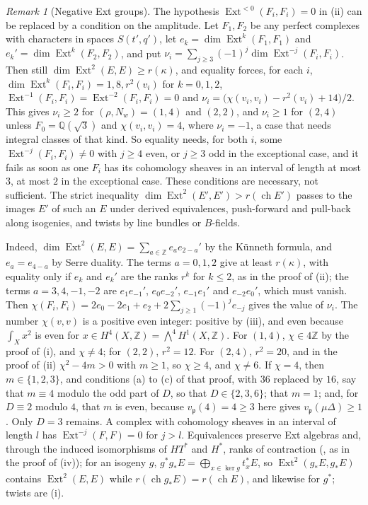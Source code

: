 \documentclass[11pt,reqno]{amsart}
\theoremstyle{plain}
\theoremstyle{definition}
\theoremstyle{remark}
\newtheorem{remark}[theorem]{Remark}
\newcommand{\QQ}{\mathbb{Q}}
\newcommand{\ZZ}{\mathbb{Z}}
\DeclareMathOperator{\ch}{ch}
\DeclareMathOperator{\Ext}{Ext}
\begin{document}
\begin{remark}[Negative Ext groups]\label{rem:quarticnegext}
The hypothesis $\Ext^{<0}(F_{i},F_{i})=0$ in
(ii) can be replaced by a condition on the
amplitude. Let $F_{1},F_{2}$ be any perfect complexes with characters in
spaces $S(t',q')$, let $e_{k}=\dim\Ext^{k}(F_{1},F_{1})$ and
$e_{k}'=\dim\Ext^{k}(F_{2},F_{2})$, and put
$\nu_{i}=\sum_{j\ge3}(-1)^{j}\dim\Ext^{-j}(F_{i},F_{i})$. Then still
$\dim\Ext^{2}(E,E)\ge r(\kappa)$, and equality forces, for each $i$,
$\dim\Ext^{k}(F_{i},F_{i})=1,8,r^{2}(v_{i})$ for $k=0,1,2$,
$\Ext^{-1}(F_{i},F_{i})=\Ext^{-2}(F_{i},F_{i})=0$ and
$\nu_{i}=\bigl(\chi(v_{i},v_{i})-r^{2}(v_{i})+14\bigr)/2$. This gives
$\nu_{i}\ge2$ for $(\rho,N_{w})=(1,4)$ and $(2,2)$, and $\nu_{i}\ge1$ for
$(2,4)$ unless $F_{0}=\QQ(\sqrt3)$ and $\chi(v_{i},v_{i})=4$, where
$\nu_{i}=-1$, a case that needs integral classes of that kind. So
equality needs, for both $i$, some $\Ext^{-j}(F_{i},F_{i})\ne0$ with $j\ge4$
even, or $j\ge3$ odd in the exceptional case, and it fails as soon as one
$F_{i}$ has its cohomology sheaves in an interval of length at most $3$, at
most $2$ in the exceptional case. These conditions are necessary, not
sufficient. The strict inequality $\dim\Ext^{2}(E',E')>r(\ch E')$ passes to
the images $E'$ of such an $E$ under derived equivalences, push-forward and
pull-back along isogenies, and twists by line bundles or $B$-fields.

Indeed, $\dim\Ext^{2}(E,E)=\sum_{a\in\ZZ}e_{a}e_{2-a}'$ by the K\"unneth
formula, and $e_{a}=e_{4-a}$ by Serre duality. The terms $a=0,1,2$ give at
least $r(\kappa)$, with equality only if $e_{k}$ and $e_{k}'$ are the ranks
$r^{k}$ for $k\le2$, as in the proof of (ii); the
terms $a=3,4,-1,-2$ are $e_{1}e_{-1}'$, $e_{0}e_{-2}'$, $e_{-1}e_{1}'$ and
$e_{-2}e_{0}'$, which must vanish. Then
$\chi(F_{i},F_{i})=2e_{0}-2e_{1}+e_{2}+2\sum_{j\ge1}(-1)^{j}e_{-j}$ gives the
value of $\nu_{i}$. The number $\chi(v,v)$ is a positive even integer:
positive by (iii), and even because $\int_{X}x^{2}$ is
even for $x\in H^{4}(X,\ZZ)=\bigwedge^{4}H^{1}(X,\ZZ)$. For $(1,4)$,
$\chi\in4\ZZ$ by the proof of (i), and $\chi\ne4$; for
$(2,2)$, $r^{2}=12$. For $(2,4)$, $r^{2}=20$, and in the proof of
(ii) $\chi^{2}-4m>0$ with $m\ge1$, so $\chi\ge4$, and
$\chi\ne6$. If $\chi=4$, then $m\in\{1,2,3\}$, and conditions (a) to (c) of
that proof, with $36$ replaced by $16$, say that $m\equiv4$ modulo the odd
part of $D$, so that $D\in\{2,3,6\}$; that $m=1$; and, for $D\equiv2$ modulo
$4$, that $m$ is even, because $v_{\mathfrak p}(4)=4\ge3$ here gives
$v_{\mathfrak p}(\mu\Delta)\ge1$. Only $D=3$ remains. A complex with cohomology
sheaves in an interval of length $l$ has $\Ext^{-j}(F,F)=0$ for $j>l$.
Equivalences preserve Ext algebras and, through the induced isomorphisms of
$HT^{*}$ and $H^{*}$, ranks of contraction (\cite{CRV12}, as in the proof of
(iv)); for an isogeny $g$,
$g^{*}g_{*}E=\bigoplus_{x\in\ker g}t_{x}^{*}E$, so $\Ext^{2}(g_{*}E,g_{*}E)$
contains $\Ext^{2}(E,E)$ while $r(\ch g_{*}E)=r(\ch E)$, and likewise for
$g^{*}$; twists are (i).
\end{remark}
\end{document}
